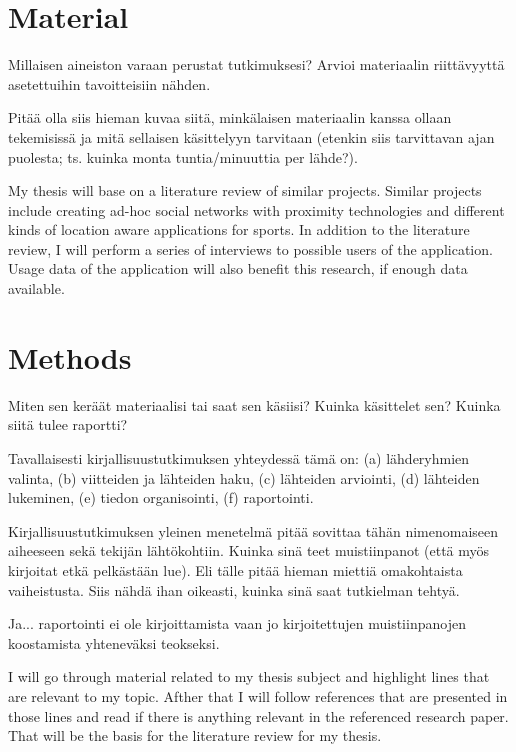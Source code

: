 \documentclass[12pt,a4paper,finnish,oneside]{article}
\begin{document}
\section{Material}

Millaisen aineiston varaan perustat tutkimuksesi? Arvioi materiaalin
riittävyyttä asetettuihin tavoitteisiin nähden.

Pitää olla siis hieman kuvaa siitä, minkälaisen materiaalin kanssa
ollaan tekemisissä ja mitä sellaisen käsittelyyn tarvitaan (etenkin
siis tarvittavan ajan puolesta; ts. kuinka monta tuntia/minuuttia per
lähde?).

My thesis will base on a literature review of similar projects. Similar projects
include creating ad-hoc social networks with proximity technologies
and different kinds of location aware applications for sports. In addition
to the literature review, I will perform a series of interviews to possible
users of the application. Usage data of the application will also benefit
this research, if enough data available.

\section{Methods}

Miten sen keräät materiaalisi tai saat sen käsiisi? Kuinka käsittelet
sen? Kuinka siitä tulee raportti?

Tavallaisesti kirjallisuustutkimuksen yhteydessä tämä on:
(a) lähderyhmien valinta,
(b) viitteiden ja lähteiden haku,
(c) lähteiden arviointi,
(d) lähteiden lukeminen,
(e) tiedon organisointi,
(f) raportointi.  %

Kirjallisuustutkimuksen yleinen menetelmä pitää sovittaa tähän
nimenomaiseen aiheeseen sekä tekijän lähtökohtiin. Kuinka sinä teet
muistiinpanot (että myös kirjoitat etkä pelkästään lue). Eli tälle
pitää hieman miettiä omakohtaista vaiheistusta. Siis nähdä ihan
oikeasti, kuinka sinä saat tutkielman tehtyä.

Ja... raportointi ei ole kirjoittamista vaan jo kirjoitettujen
muistiinpanojen koostamista yhteneväksi teokseksi.

I will go through material related to my thesis subject and highlight
lines that are relevant to my topic. Afther that I will follow references
that are presented in those lines and read if there is anything relevant
in the referenced research paper. That will be the basis for the literature
review for my thesis.
\end{document}
